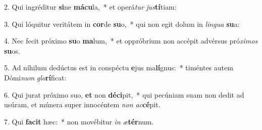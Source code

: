 2. Qui ingréditur \textbf{si}ne \textbf{má}\textbf{cu}la,~*  et operá\textit{tur} \textit{jus}\textbf{tí}tiam:\

3. Qui lóquitur veritátem in \textbf{cor}de \textbf{su}o,~*  qui non egit dolum in \textit{lin}\textit{gua} \textbf{su}a:\

4. Nec fecit próximo \textbf{su}o \textbf{ma}lum,~*  et oppróbrium non accépit advérsus pró\textit{xi}\textit{mos} \textbf{su}os.\

5. Ad níhilum dedúctus est in conspéctu \textbf{e}jus ma\textbf{lí}gnus:~*  timéntes autem Dómi\textit{num} \textit{glo}\textbf{rí}ficat:\

6. Qui jurat próximo suo, \textbf{et} non \textbf{dé}\textbf{ci}pit,~*  qui pecúniam suam non dedit ad usúram, et múnera super innocéntem \textit{non} \textit{ac}\textbf{cé}pit.\

7. Qui \textbf{fa}\textbf{cit} hæc:~*  non movébitur \textit{in} \textit{æ}\textbf{tér}num.\

